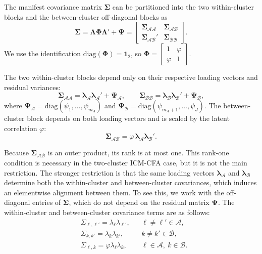 \documentclass[
  american,
  man,floatsintext]{apa7}
\begin{document}
The manifest covariance matrix \(\pmb\Sigma\) can be partitioned into the two within-cluster blocks and the between-cluster off-diagonal blocks as
\begin{equation}\label{covMatrixBlocks}
\pmb\Sigma=\pmb\Lambda\pmb\Phi\pmb\Lambda'+\pmb\Psi=
\begin{bmatrix}
\pmb\Sigma_{\mathcal{AA}} & \pmb\Sigma_{\mathcal{AB}}\\
\pmb\Sigma_{\mathcal{AB}}' & \pmb\Sigma_{\mathcal{BB}}
\end{bmatrix}.
\end{equation}
We use the identification \(\mathrm{diag}(\pmb\Phi)=\pmb{1}_2\), so \(\pmb\Phi=\begin{bmatrix}1&\varphi\\ \varphi&1\end{bmatrix}\).

The two within-cluster blocks depend only on their respective loading vectors and residual variances:
\[
\pmb\Sigma_{\mathcal{AA}}=\pmb\lambda_{\mathcal A}\pmb\lambda_{\mathcal A}'+\pmb\Psi_{\mathcal A},
\qquad
\pmb\Sigma_{\mathcal{BB}}=\pmb\lambda_{\mathcal B}\pmb\lambda_{\mathcal B}'+\pmb\Psi_{\mathcal B},
\]
where \(\pmb\Psi_{\mathcal A}=\mathrm{diag}(\psi_1,\ldots,\psi_{m_A})\) and
\(\pmb\Psi_{\mathcal B}=\mathrm{diag}(\psi_{m_A+1},\ldots,\psi_J)\). The between-cluster block depends on both loading vectors and is scaled by the latent correlation \(\varphi\):
\begin{equation}\label{outterP}
\pmb\Sigma_{\mathcal{AB}}=\varphi\,\pmb\lambda_{\mathcal A}\pmb\lambda_{\mathcal B}'.
\end{equation}

Because \(\pmb\Sigma_{\mathcal{AB}}\) is an outer product, its rank is at most one. This rank-one condition is necessary in the two-cluster ICM-CFA case, but it is not the main restriction. The stronger restriction is that the same loading vectors \(\pmb\lambda_{\mathcal A}\) and \(\pmb\lambda_{\mathcal B}\) determine both the within-cluster and between-cluster covariances, which induces an elementwise alignment between them. To see this, we work with the off-diagonal entries of \(\pmb\Sigma\), which do not depend on the residual matrix \(\pmb\Psi\). The within-cluster and between-cluster covariance terms are as follows:
\begin{equation}\label{blockElements}
\begin{aligned}
&\Sigma_{\ell,\ell'} = \lambda_\ell \lambda_{\ell'}, && \ell\neq \ell'\in\mathcal{A},\\
&\Sigma_{k,k'} = \lambda_k \lambda_{k'}, && k\neq k'\in\mathcal{B},\\
&\Sigma_{\ell,k} = \varphi \lambda_\ell \lambda_k, && \ell\in \mathcal{A},\ k\in \mathcal{B}.
\end{aligned}
\end{equation}
\end{document}
